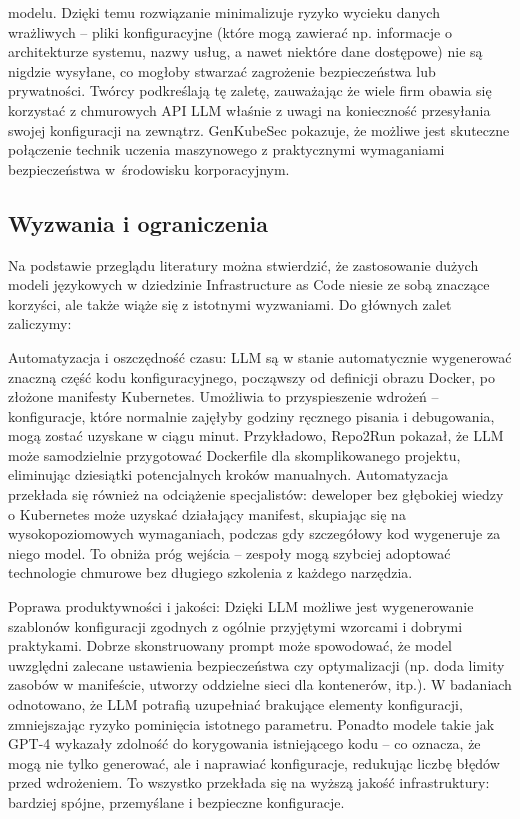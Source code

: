 modelu. Dzięki temu rozwiązanie minimalizuje ryzyko wycieku danych wrażliwych – pliki konfiguracyjne (które mogą zawierać np. informacje o architekturze systemu, nazwy usług, a nawet niektóre dane dostępowe) nie są nigdzie wysyłane, co mogłoby stwarzać zagrożenie bezpieczeństwa lub prywatności. Twórcy podkreślają tę zaletę, zauważając że wiele firm obawia się korzystać z chmurowych API LLM właśnie z uwagi na konieczność przesyłania swojej konfiguracji na zewnątrz. GenKubeSec pokazuje, że możliwe jest skuteczne połączenie technik uczenia maszynowego z praktycznymi wymaganiami bezpieczeństwa w środowisku korporacyjnym.

\subsection{Wyzwania i ograniczenia}


Na podstawie przeglądu literatury można stwierdzić, że zastosowanie dużych modeli językowych w dziedzinie Infrastructure as Code niesie ze sobą znaczące korzyści, ale także wiąże się z istotnymi wyzwaniami. Do głównych zalet zaliczymy:

Automatyzacja i oszczędność czasu: LLM są w stanie automatycznie wygenerować znaczną część kodu konfiguracyjnego, począwszy od definicji obrazu Docker, po złożone manifesty Kubernetes. Umożliwia to przyspieszenie wdrożeń – konfiguracje, które normalnie zajęłyby godziny ręcznego pisania i debugowania, mogą zostać uzyskane w ciągu minut. Przykładowo, Repo2Run pokazał, że LLM może samodzielnie przygotować Dockerfile dla skomplikowanego projektu, eliminując dziesiątki potencjalnych kroków manualnych. Automatyzacja przekłada się również na odciążenie specjalistów: deweloper bez głębokiej wiedzy o Kubernetes może uzyskać działający manifest, skupiając się na wysokopoziomowych wymaganiach, podczas gdy szczegółowy kod wygeneruje za niego model. To obniża próg wejścia – zespoły mogą szybciej adoptować technologie chmurowe bez długiego szkolenia z każdego narzędzia.

Poprawa produktywności i jakości: Dzięki LLM możliwe jest wygenerowanie szablonów konfiguracji zgodnych z ogólnie przyjętymi wzorcami i dobrymi praktykami. Dobrze skonstruowany prompt może spowodować, że model uwzględni zalecane ustawienia bezpieczeństwa czy optymalizacji (np. doda limity zasobów w manifeście, utworzy oddzielne sieci dla kontenerów, itp.). W badaniach odnotowano, że LLM potrafią uzupełniać brakujące elementy konfiguracji, zmniejszając ryzyko pominięcia istotnego parametru. Ponadto modele takie jak GPT-4 wykazały zdolność do korygowania istniejącego kodu – co oznacza, że mogą nie tylko generować, ale i naprawiać konfiguracje, redukując liczbę błędów przed wdrożeniem. To wszystko przekłada się na wyższą jakość infrastruktury: bardziej spójne, przemyślane i bezpieczne konfiguracje.

